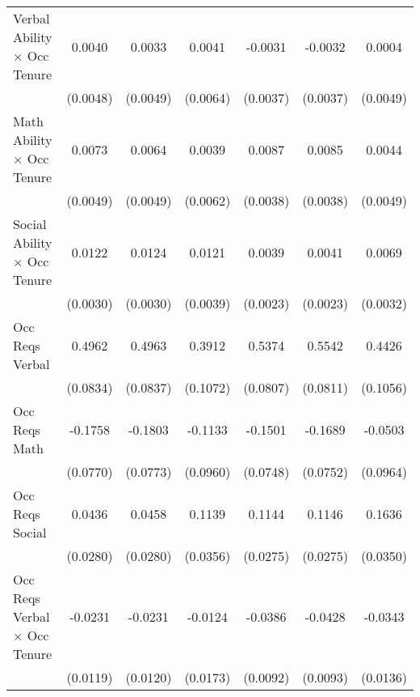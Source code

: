 {\begin{longtable}{l*{6}{c}}
Verbal Ability $\times$ Occ Tenure&      0.0040         &      0.0033         &      0.0041         &     -0.0031         &     -0.0032         &      0.0004         \\
                    &    (0.0048)         &    (0.0049)         &    (0.0064)         &    (0.0037)         &    (0.0037)         &    (0.0049)         \\
Math Ability $\times$ Occ Tenure&      0.0073         &      0.0064         &      0.0039         &      0.0087\sym{**} &      0.0085\sym{**} &      0.0044         \\
                    &    (0.0049)         &    (0.0049)         &    (0.0062)         &    (0.0038)         &    (0.0038)         &    (0.0049)         \\
Social Ability $\times$ Occ Tenure&      0.0122\sym{***}&      0.0124\sym{***}&      0.0121\sym{***}&      0.0039\sym{*}  &      0.0041\sym{*}  &      0.0069\sym{**} \\
                    &    (0.0030)         &    (0.0030)         &    (0.0039)         &    (0.0023)         &    (0.0023)         &    (0.0032)         \\
Occ Reqs Verbal     &      0.4962\sym{***}&      0.4963\sym{***}&      0.3912\sym{***}&      0.5374\sym{***}&      0.5542\sym{***}&      0.4426\sym{***}\\
                    &    (0.0834)         &    (0.0837)         &    (0.1072)         &    (0.0807)         &    (0.0811)         &    (0.1056)         \\
Occ Reqs Math       &     -0.1758\sym{**} &     -0.1803\sym{**} &     -0.1133         &     -0.1501\sym{**} &     -0.1689\sym{**} &     -0.0503         \\
                    &    (0.0770)         &    (0.0773)         &    (0.0960)         &    (0.0748)         &    (0.0752)         &    (0.0964)         \\
Occ Reqs Social     &      0.0436         &      0.0458         &      0.1139\sym{***}&      0.1144\sym{***}&      0.1146\sym{***}&      0.1636\sym{***}\\
                    &    (0.0280)         &    (0.0280)         &    (0.0356)         &    (0.0275)         &    (0.0275)         &    (0.0350)         \\
Occ Reqs Verbal $\times$ Occ Tenure&     -0.0231\sym{*}  &     -0.0231\sym{*}  &     -0.0124         &     -0.0386\sym{***}&     -0.0428\sym{***}&     -0.0343\sym{**} \\
                    &    (0.0119)         &    (0.0120)         &    (0.0173)         &    (0.0092)         &    (0.0093)         &    (0.0136)         \\

\end{longtable}}
